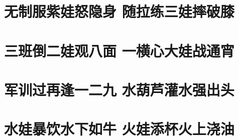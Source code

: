 \documentclass[12pt, a4paper]{book}
\begin{document}
\begin{CJK}{UTF8}{gbsn}
    \chapter{无制服紫娃怒隐身 随拉练三娃摔破膝}

    \chapter{三班倒二娃观八面 一横心大娃战通宵}

    \chapter{军训过再逢一二九 水葫芦灌水强出头}

    \chapter{水娃暴饮水下如牛 火娃添杯火上浇油}

    \appendix

    

\end{CJK}
\end{document}
